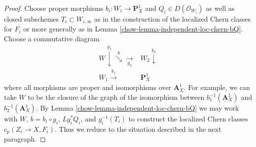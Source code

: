 \begin{proof}

Choose proper morphisms $b_i : W_i \to \mathbf{P}^1_X$ and
$Q_i \in D(\mathcal{O}_{W_i})$ as well as closed subschemes
$T_i \subset W_{i, \infty}$ as in the construction of
the localized Chern classes for $F_i$ or more generally as in
Lemma \ref{chow-lemma-independent-loc-chern-bQ}. Choose a commutative
diagram
$$
\begin{array}{cc}W \overset{g_1}{\downarrow}\overset{b}{\searrow}\underset{g_2}{\longrightarrow} & W_2 \overset{b_2}{\downarrow} \\ W_1 \overset{b_1}{\longrightarrow} & \mathbf{P}^1_X\end{array}
$$
where all morphisms are proper and isomorphisms over
$\mathbf{A}^1_X$. For example, we can take $W$ to be the closure
of the graph of the isomorphism between
$b_1^{-1}(\mathbf{A}^1_X)$ and $b_2^{-1}(\mathbf{A}^1_X)$.
By Lemma \ref{chow-lemma-independent-loc-chern-bQ} we may work with
$W$, $b = b_i \circ g_i$, $Lg_i^*Q_i$, and
$g_i^{-1}(T_i)$ to construct the localized Chern classes
$c_p(Z_i \to X, F_i)$. Thus we reduce to the situation described
in the next paragraph.


\end{proof}
